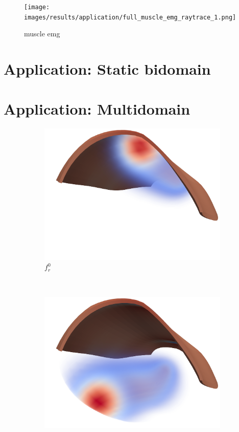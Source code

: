 \begin{figure}[H]
  \centering%
  \texttt{[image: images/results/application/full\_muscle\_emg\_raytrace\_1.png]}%
  \caption{muscle emg}%
  \label{fig:full_muscle_emg_raytrace_1}%
\end{figure}


\section{Application: Static bidomain}
\section{Application: Multidomain}


\begin{figure}[H]
  \centering%
  \begin{subfigure}[t]{0.23\textwidth}%
    \centering%
    \includegraphics[width=\textwidth]{images/results/application/multidomain_fr0_cropped.png}%
    \caption{$f_r^0$}%
    \label{fig:fr0}%
  \end{subfigure}
  \,
  \begin{subfigure}[t]{0.23\textwidth}%
    \centering%
    \includegraphics[width=\textwidth]{images/results/application/multidomain_fr1_cropped.png}%

\end{subfigure}
\end{figure}

